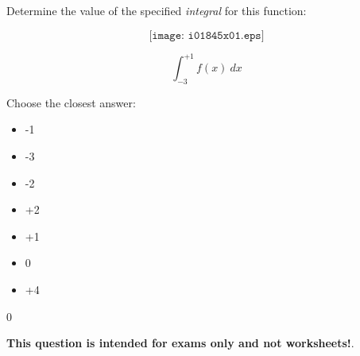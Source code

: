 

Determine the value of the specified {\it integral} for this function:

$$\texttt{[image: i01845x01.eps]}$$

$$\int_{-3}^{+1} f(x) \> dx$$

Choose the closest answer:

\begin{itemize}
\item{} -1
\vskip 10pt 
\item{} -3
\vskip 10pt 
\item{} -2
\vskip 10pt 
\item{} +2
\vskip 10pt 
\item{} +1
\vskip 10pt 
\item{} 0
\vskip 10pt 
\item{} +4
\end{itemize}








0






{\bf This question is intended for exams only and not worksheets!}.



